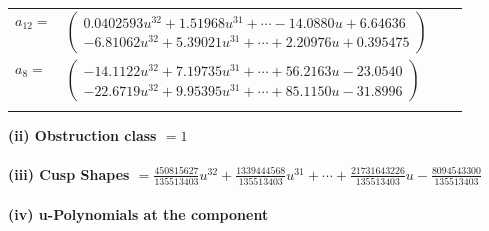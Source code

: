 \documentclass[1p]{elsarticle_modified}
\theoremstyle{definition}
\begin{document}
\begin{tabular}{m{7pt} m{180pt} m{7pt} m{180pt} }
\flushright $a_{12}=$&$\begin{pmatrix}0.0402593 u^{32}+1.51968 u^{31}+\cdots-14.0880 u+6.64636\\-6.81062 u^{32}+5.39021 u^{31}+\cdots+2.20976 u+0.395475\end{pmatrix}$ \\
\flushright $a_{8}=$&$\begin{pmatrix}-14.1122 u^{32}+7.19735 u^{31}+\cdots+56.2163 u-23.0540\\-22.6719 u^{32}+9.95395 u^{31}+\cdots+85.1150 u-31.8996\end{pmatrix}$\\&\end{tabular}
\flushleft \textbf{(ii) Obstruction class $= 1$}\\~\\
\flushleft \textbf{(iii) Cusp Shapes $= \frac{450815627}{135513403} u^{32}+\frac{1339444568}{135513403} u^{31}+\cdots+\frac{21731643226}{135513403} u-\frac{8094543300}{135513403}$}\\~\\
\newpage\renewcommand{\arraystretch}{1}
\flushleft \textbf{(iv) u-Polynomials at the component}\newline \\
\end{document}
